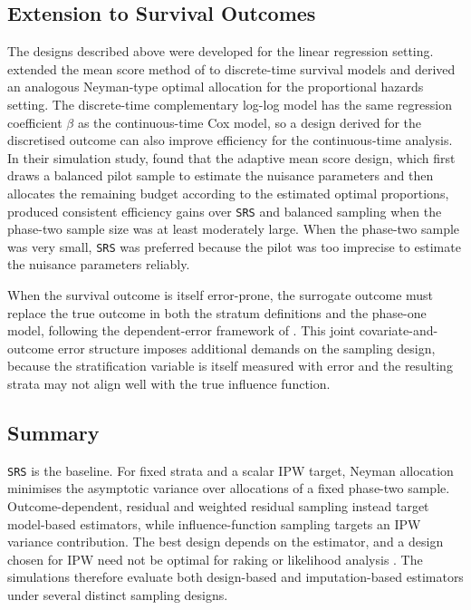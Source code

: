 \subsection{Extension to Survival Outcomes}
\label{sec:sampling_survival}

The designs described above were developed for the linear regression setting. \citet{han2021two} extended the mean score method of \citet{Reilly1995} to discrete-time survival models and derived an analogous Neyman-type optimal allocation for the proportional hazards setting. The discrete-time complementary log-log model has the same regression coefficient $\beta$ as the continuous-time Cox model, so a design derived for the discretised outcome can also improve efficiency for the continuous-time analysis. In their simulation study, \citet{han2021two} found that the adaptive mean score design, which first draws a balanced pilot sample to estimate the nuisance parameters and then allocates the remaining budget according to the estimated optimal proportions, produced consistent efficiency gains over \texttt{SRS} and balanced sampling when the phase-two sample size was at least moderately large. When the phase-two sample was very small, \texttt{SRS} was preferred because the pilot was too imprecise to estimate the nuisance parameters reliably.

When the survival outcome is itself error-prone, the surrogate outcome must replace the true outcome in both the stratum definitions and the phase-one model, following the dependent-error framework of \citet{giganti2020accounting}. This joint covariate-and-outcome error structure imposes additional demands on the sampling design, because the stratification variable is itself measured with error and the resulting strata may not align well with the true influence function.

\subsection{Summary}

\texttt{SRS} is the baseline. For fixed strata and a scalar IPW target, Neyman allocation minimises the asymptotic variance over allocations of a fixed phase-two sample. Outcome-dependent, residual and weighted residual sampling instead target model-based estimators, while influence-function sampling targets an IPW variance contribution. The best design depends on the estimator, and a design chosen for IPW need not be optimal for raking or likelihood analysis \citep{amorim2021two}. The simulations therefore evaluate both design-based and imputation-based estimators under several distinct sampling designs.
